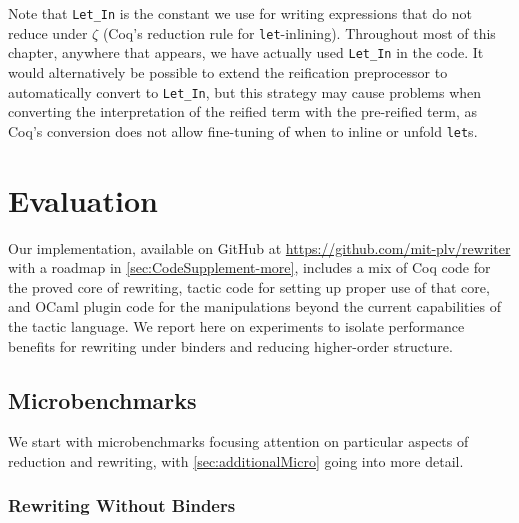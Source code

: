 Note that \texttt{Let_In} is the constant we use for writing  expressions that do not reduce under $\zeta$ (Coq's reduction rule for \texttt{let}-inlining).
Throughout most of this chapter, anywhere that  appears, we have actually used \texttt{Let_In} in the code.
It would alternatively be possible to extend the reification preprocessor to automatically convert  to \texttt{Let_In}, but this strategy may cause problems when converting the interpretation of the reified term with the pre-reified term, as Coq's conversion does not allow fine-tuning of when to inline or unfold \texttt{let}s.

\section{Evaluation}\label{sec:evaluation}

Our implementation, available on GitHub at \url{https://github.com/mit-plv/rewriter} with a roadmap in \autoref{sec:CodeSupplement-more}, includes a mix of Coq code for the proved core of rewriting, tactic code for setting up proper use of that core, and OCaml plugin code for the manipulations beyond the current capabilities of the tactic language.
We report here on experiments to isolate performance benefits for rewriting under binders and reducing higher-order structure.

\subsection{Microbenchmarks}\label{sec:micro}

\def\NoBindersSubfloatNval{3}%
\def\NoBindersSubfloatXRow{\thisrowno{0}*(2^(\nval+1)-1)}%

We start with microbenchmarks focusing attention on particular aspects of reduction and rewriting, with \autoref{sec:additionalMicro} going into more detail.

\bgroup
{}
\subsubsection{Rewriting Without Binders}\label{sec:micro:Plus0Tree}

